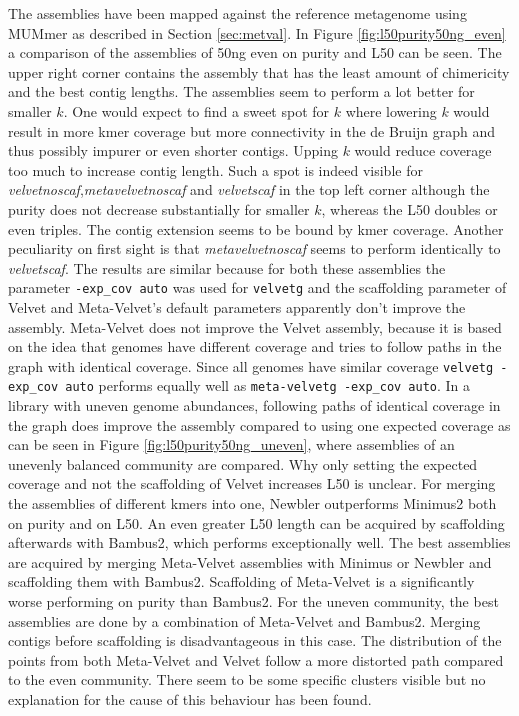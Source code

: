 \documentclass[a4paper,12pt]{article}
\begin{document}
The assemblies have been mapped against the reference metagenome using MUMmer
as described in Section \ref{sec:metval}. In Figure
\ref{fig:l50purity50ng_even} a comparison of the assemblies of 50ng even on
purity and L50 can be seen. The upper right corner contains the assembly that
has the least amount of chimericity and the best contig lengths. The assemblies
seem to perform a lot better for smaller $k$. One would expect to find a sweet
spot for $k$ where lowering $k$ would result in more kmer coverage but more
connectivity in the de Bruijn graph and thus possibly impurer or even shorter
contigs. Upping $k$ would reduce coverage too much to increase contig length.
Such a spot is indeed visible for {\em velvetnoscaf},{\em metavelvetnoscaf} and
{\em velvetscaf} in the top left corner although the purity does not decrease
substantially for smaller $k$, whereas the L50 doubles or even triples. The
contig extension seems to be bound by kmer coverage. Another peculiarity on
first sight is that {\em metavelvetnoscaf} seems to perform identically to {\em
velvetscaf}. The results are similar because for both these assemblies the
parameter \verb!-exp_cov auto! was used for \verb!velvetg! and the scaffolding
parameter of Velvet and Meta-Velvet's default parameters apparently don't
improve the assembly. Meta-Velvet does not improve the Velvet assembly, because
it is based on the idea that genomes have different coverage and tries to
follow paths in the graph with identical coverage. Since all genomes have
similar coverage \verb!velvetg -exp_cov auto!  performs equally well as
\verb!meta-velvetg -exp_cov auto!. In a library with uneven genome abundances,
following paths of identical coverage in the graph does improve the assembly
compared to using one expected coverage as can be seen in Figure
\ref{fig:l50purity50ng_uneven}, where assemblies of an unevenly balanced
community are compared. Why only setting the expected coverage and not the
scaffolding of Velvet increases L50 is unclear. For merging the assemblies of
different kmers into one, Newbler outperforms Minimus2 both on purity and on
L50. An even greater L50 length can be acquired by scaffolding afterwards with
Bambus2, which performs exceptionally well. The best assemblies are
acquired by merging Meta-Velvet assemblies with Minimus or Newbler and
scaffolding them with Bambus2. Scaffolding of Meta-Velvet is a significantly
worse performing on purity than Bambus2. For the uneven community, the best
assemblies are done by a combination of Meta-Velvet and Bambus2. Merging
contigs before scaffolding is disadvantageous in this case. The distribution of
the points from both Meta-Velvet and Velvet follow a more distorted path
compared to the even community. There seem to be some specific clusters visible
but no explanation for the cause of this behaviour has been found.
\end{document}

